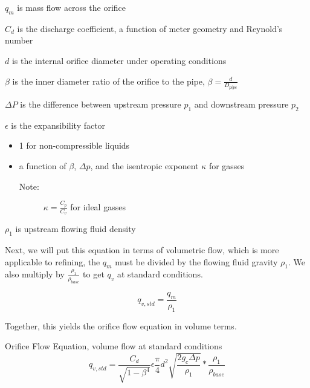 \documentclass{article}
\begin{document}
    \begin{description}
        \item $q_m$ is mass flow across the orifice
        \item $C_d$ is the discharge coefficient, a function of meter geometry and Reynold's number
        \item $d$ is the internal orifice diameter under operating conditions
        \item $\beta$ is the inner diameter ratio of the orifice to the pipe, $\beta = \frac{d}{D_{pipe}}$
        \item $\Delta P$ is the difference between upstream pressure $p_1$ and downstream pressure $p_2$
        \item $\epsilon$ is the expansibility factor
        \begin{itemize}
            \item 1 for non-compressible liquids
            \item a function of $\beta$, $\Delta p$, and the isentropic exponent $\kappa$ for gasses
            \begin{description}
                \item[Note:]$\kappa = \frac{C_p}{C_v}$ for ideal gasses
            \end{description}
        \end{itemize} 
        \item $\rho_1$ is upstream flowing fluid density
    \end{description}

Next, we will put this equation in terms of volumetric flow, which is more applicable to refining, the $q_m$ must be divided by the flowing fluid gravity $\rho_1$. We also multiply by $\frac{\rho_{1}}{\rho_{base}}$ to get $q_v$ at standard conditions.

\begin{equation}
    q_{v,std} = \frac{q_m}{\rho_1}
\end{equation}

Together, this yields the orifice flow equation in volume terms.
\begin{proposition}
Orifice Flow Equation, volume flow at standard conditions
    \begin{equation}
        q_{v, std} =  \frac{C_d}{\sqrt{1-\beta^4}}\epsilon\frac{\pi}{4}d^2 \sqrt{\frac{2 g_c \Delta p}{\rho_{1}}}*\frac{\rho_{1}}{\rho_{base}}
    \end{equation}
\end{proposition}
\end{document}
